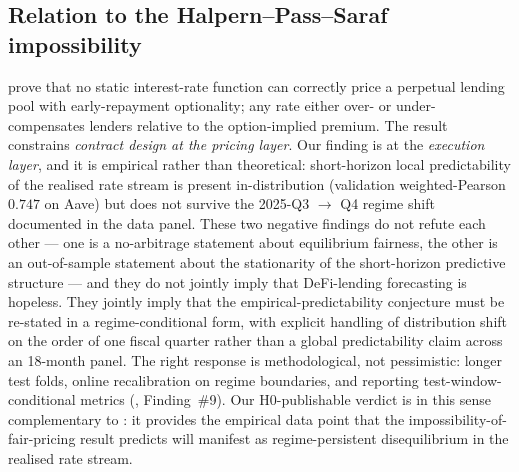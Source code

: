 \subsection{Relation to the Halpern--Pass--Saraf impossibility}
\label{sec:disc-impossibility}

\cite{halpern2024fair} prove that no static interest-rate function can
correctly price a perpetual lending pool with early-repayment
optionality; any rate either over- or under-compensates lenders
relative to the option-implied premium.  The result constrains
\emph{contract design at the pricing layer}.  Our finding is at the
\emph{execution layer}, and it is empirical rather than theoretical:
short-horizon local predictability of the realised rate stream is
present in-distribution (validation weighted-Pearson $0.747$ on Aave)
but does not survive the 2025-Q3 $\to$ Q4 regime shift documented in
the data panel.  These two negative findings do not refute each other
--- one is a no-arbitrage statement about equilibrium fairness, the
other is an out-of-sample statement about the stationarity of the
short-horizon predictive structure --- and they do not jointly imply
that DeFi-lending forecasting is hopeless.  They jointly imply that
the empirical-predictability conjecture must be re-stated in a
regime-conditional form, with explicit handling of distribution shift
on the order of one fiscal quarter rather than a global predictability
claim across an 18-month panel.  The right response is methodological,
not pessimistic: longer test folds, online recalibration on regime
boundaries, and reporting test-window-conditional metrics
(, Finding~\#9).  Our H0-publishable verdict is
in this sense complementary to \cite{halpern2024fair}: it provides the
empirical data point that the impossibility-of-fair-pricing result
predicts will manifest as regime-persistent disequilibrium in the
realised rate stream.

